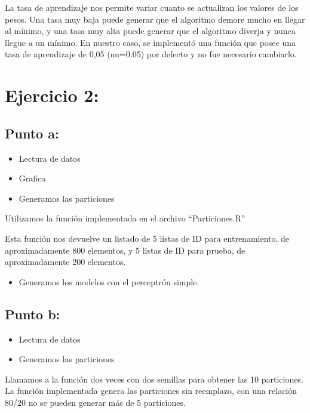 \documentclass[]{book}
\providecommand{\tightlist}{%
  \setlength{\itemsep}{0pt}\setlength{\parskip}{0pt}}
\begin{document}
La tasa de aprendizaje nos permite variar cuanto se actualizan los valores de los pesos. Una tasa muy baja puede generar que el algoritmo demore mucho en llegar al mínimo, y una tasa muy alta puede generar que el algoritmo diverja y nunca llegue a un mínimo.
En nuestro caso, se implementó una función que posee una tasa de aprendizaje de 0,05 (nu=0.05) por defecto y no fue necesario cambiarlo.

\hypertarget{ejercicio-2}{%
\section{Ejercicio 2:}\label{ejercicio-2}}

\hypertarget{punto-a}{%
\subsection{Punto a:}\label{punto-a}}

\begin{itemize}
\item
  Lectura de datos
\item
  Grafica
\item
  Generamos las particiones
\end{itemize}

Utilizamos la función implementada en el archivo ``Particiones.R''

Esta función nos devuelve un listado de 5 listas de ID para entrenamiento, de aproximadamente 800 elementos, y 5 listas de ID para prueba, de aproximadamente 200 elementos.

\begin{itemize}
\tightlist
\item
  Generamos los modelos con el perceptrón simple.
\end{itemize}

\hypertarget{punto-b}{%
\subsection{Punto b:}\label{punto-b}}

\begin{itemize}
\item
  Lectura de datos
\item
  Generamos las particiones
\end{itemize}

Llamamos a la función dos veces con dos semillas para obtener las 10 particiones. La función implementada genera las particiones sin reemplazo, con una relación 80/20 no se pueden generar más de 5 particiones.
\end{document}
